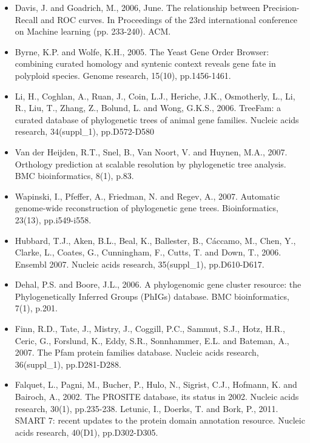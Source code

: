 \documentclass{article}
\begin{document}
\begin{itemize}
			\item Davis, J. and Goadrich, M., 2006, June. The relationship between Precision-Recall and ROC curves. In Proceedings of the 23rd international conference on Machine learning (pp. 233-240). ACM.
			
			\item Byrne, K.P. and Wolfe, K.H., 2005. The Yeast Gene Order Browser: combining curated homology and syntenic context reveals gene fate in polyploid species. Genome research, 15(10), pp.1456-1461.
			
			\item Li, H., Coghlan, A., Ruan, J., Coin, L.J., Heriche, J.K., Osmotherly, L., Li, R., Liu, T., Zhang, Z., Bolund, L. and Wong, G.K.S., 2006. TreeFam: a curated database of phylogenetic trees of animal gene families. Nucleic acids research, 34(suppl\_1), pp.D572-D580
			
			\item Van der Heijden, R.T., Snel, B., Van Noort, V. and Huynen, M.A., 2007. Orthology prediction at scalable resolution by phylogenetic tree analysis. BMC bioinformatics, 8(1), p.83.
			
			
			\item Wapinski, I., Pfeffer, A., Friedman, N. and Regev, A., 2007. Automatic genome-wide reconstruction of phylogenetic gene trees. Bioinformatics, 23(13), pp.i549-i558.
			
			\item Hubbard, T.J., Aken, B.L., Beal, K., Ballester, B., Cáccamo, M., Chen, Y., Clarke, L., Coates, G., Cunningham, F., Cutts, T. and Down, T., 2006. Ensembl 2007. Nucleic acids research, 35(suppl\_1), pp.D610-D617.
			
			\item Dehal, P.S. and Boore, J.L., 2006. A phylogenomic gene cluster resource: the Phylogenetically Inferred Groups (PhIGs) database. BMC bioinformatics, 7(1), p.201.
			
			\item Finn, R.D., Tate, J., Mistry, J., Coggill, P.C., Sammut, S.J., Hotz, H.R., Ceric, G., Forslund, K., Eddy, S.R., Sonnhammer, E.L. and Bateman, A., 2007. The Pfam protein families database. Nucleic acids research, 36(suppl\_1), pp.D281-D288.
			
			\item Falquet, L., Pagni, M., Bucher, P., Hulo, N., Sigrist, C.J., Hofmann, K. and Bairoch, A., 2002. The PROSITE database, its status in 2002. Nucleic acids research, 30(1), pp.235-238.
			Letunic, I., Doerks, T. and Bork, P., 2011. SMART 7: recent updates to the protein domain annotation resource. Nucleic acids research, 40(D1), pp.D302-D305.
			

\end{itemize}
\end{document}
